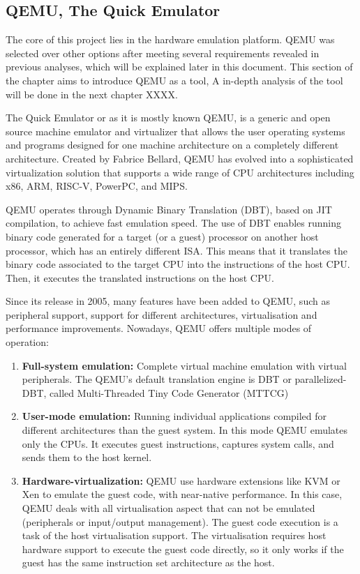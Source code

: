 \subsection{QEMU, The Quick Emulator}
\label{chap:Back_QEMU}

The core of this project lies in the hardware emulation platform. QEMU was 
selected over other options after meeting several requirements revealed in previous 
analyses, which will be explained later in this document. This section of the chapter 
aims to introduce QEMU as a tool, A in-depth analysis of the tool will be done in 
the next chapter XXXX.

The Quick Emulator or as it is mostly known QEMU, is a generic and 
open source machine emulator and virtualizer that allows the user operating 
systems and programs designed for one machine architecture on a completely different 
architecture. Created by Fabrice Bellard, QEMU has evolved into a sophisticated 
virtualization solution that supports a wide range of CPU architectures including 
x86, ARM, RISC-V, PowerPC, and MIPS. 

QEMU operates through Dynamic Binary Translation (DBT), based on JIT 
compilation, to achieve fast emulation speed. The use of DBT enables running 
binary code generated for a target (or a guest) processor on another host processor, 
which has an entirely different ISA. This means that it translates the binary code 
associated to the target CPU into the instructions of the host CPU. Then, it executes 
the translated instructions on the host CPU.

Since its release in 2005, many features have been added to QEMU, such as 
peripheral support, support for different architectures, virtualisation and performance 
improvements. Nowadays, QEMU offers multiple modes of operation:

\begin{enumerate}
  \item \textbf{Full-system emulation:} 
  Complete virtual machine emulation with virtual 
  peripherals. The QEMU's default translation engine is DBT or parallelized-DBT, 
  called Multi-Threaded Tiny Code Generator (MTTCG)

  \item \textbf{User-mode emulation:} 
  Running individual applications compiled for different 
  architectures than the guest system. In this mode QEMU emulates only 
  the CPUs. It executes guest instructions, captures system calls, and sends 
  them to the host kernel. 
  
  \item \textbf{Hardware-virtualization:} 
  QEMU use hardware extensions like KVM or Xen 
  to emulate the guest code, with near-native performance. In this case, QEMU 
  deals with all virtualisation aspect that can not be emulated (peripherals or 
  input/output management). The guest code execution is a task of the host 
  virtualisation support. The virtualisation requires host hardware support to 
  execute the guest code directly, so it only works if the guest has the same 
  instruction set architecture as the host.
\end{enumerate}


